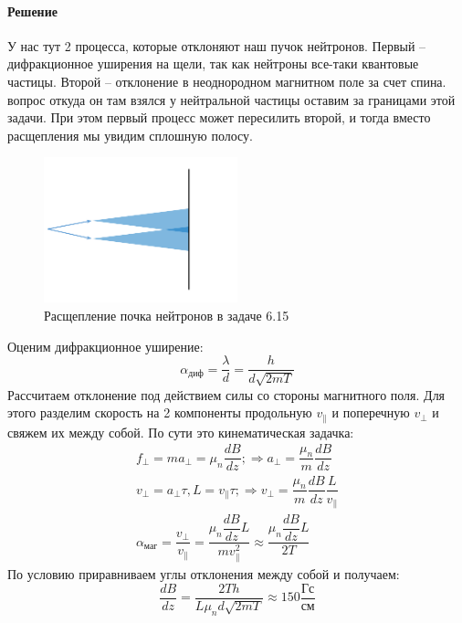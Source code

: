 \documentclass[12pt]{article}
\begin{document}
\paragraph{Решение}
У нас тут 2 процесса, которые отклоняют наш пучок нейтронов. Первый -- дифракционное уширения на щели, так как нейтроны все-таки квантовые частицы. Второй -- отклонение в неоднородном магнитном поле за счет спина. вопрос откуда он там взялся у нейтральной частицы оставим за границами этой задачи. При этом первый процесс может пересилить второй, и тогда вместо расщепления мы увидим сплошную полосу. 
\begin{figure}[h]
    \centering
    \includegraphics[width=0.5\textwidth,height=\textheight,keepaspectratio]{Seminar_07/pics/pic_03.pdf}
    \caption{Расщепление почка нейтронов в задаче 6.15 }
    \label{fig:sem_04}
\end{figure}
Оценим дифракционное уширение:
\begin{equation*}
    \alpha_{\text{диф}}= \dfrac{\lambda}{d} = \dfrac{h}{d\sqrt{2mT}}
\end{equation*}
Рассчитаем отклонение под действием силы со стороны магнитного поля. Для этого разделим скорость на 2 компоненты продольную $v_{\parallel}$ и поперечную $v_{\perp}$ и свяжем их между собой. По сути это кинематическая задачка:
\begin{gather*}
    f_{\perp} =m a_{\perp} = \mu_n \dfrac{dB}{dz}; \Rightarrow a_{\perp} = \dfrac{\mu_n}{m} \dfrac{dB}{dz}\\
    v_{\perp} = a_{\perp} \tau, L=v_{\parallel}\tau; \Rightarrow v_{\perp} = \dfrac{\mu_n}{m} \dfrac{dB}{dz} \dfrac{L}{v_{\parallel}}\\
    \alpha_{\text{маг}}= \dfrac{v_{\perp}}{v_{\parallel}} = \dfrac{\mu_n \dfrac{dB}{dz} L}{mv^2_{\parallel}} \approx \dfrac{\mu_n \dfrac{dB}{dz} L}{2T}
\end{gather*}
По условию приравниваем углы отклонения между собой и получаем:
\begin{equation*}
    \dfrac{dB}{dz} = \dfrac{2Th}{L\mu_nd\sqrt{2mT}} \approx 150 \dfrac{\text{Гс}}{\text{см}}
\end{equation*}
\end{document}
